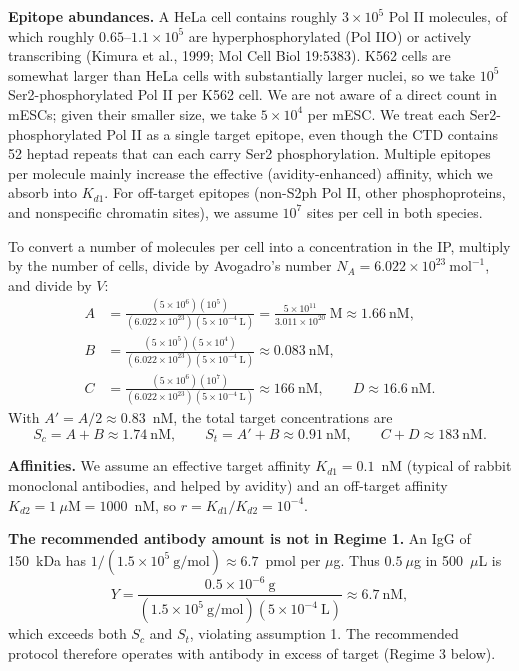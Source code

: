 \documentclass[11pt]{article}
\begin{document}
\textbf{Epitope abundances.} A HeLa cell contains roughly
$3\times10^5$ Pol II molecules, of which roughly $0.65$--$1.1\times10^5$
are hyperphosphorylated (Pol IIO) or actively transcribing (Kimura et
al., 1999; Mol Cell Biol 19:5383). K562 cells are somewhat larger than
HeLa cells with substantially larger nuclei, so we take
$10^5$ Ser2-phosphorylated Pol II per K562 cell. We are not aware of a
direct count in mESCs; given their smaller size, we take
$5\times10^4$ per mESC. We treat each Ser2-phosphorylated Pol II as a
single target epitope, even though the CTD contains 52 heptad repeats
that can each carry Ser2 phosphorylation. Multiple epitopes per
molecule mainly increase the effective (avidity-enhanced) affinity, which
we absorb into $K_{d1}$. For off-target epitopes (non-S2ph Pol II, other
phosphoproteins, and nonspecific chromatin sites), we assume $10^7$ sites
per cell in both species.

To convert a number of molecules per cell into a concentration in the IP,
multiply by the number of cells, divide by Avogadro's number
$N_A=6.022\times10^{23}~\text{mol}^{-1}$, and divide by $V$:
$$\begin{aligned}
A
&=\frac{(5\times10^6)(10^5)}{(6.022\times10^{23})(5\times10^{-4}~\text{L})}
=\frac{5\times10^{11}}{3.011\times10^{20}}~\text{M}
\approx1.66~\text{nM}, \\
B
&=\frac{(5\times10^5)(5\times10^4)}{(6.022\times10^{23})(5\times10^{-4}~\text{L})}
\approx0.083~\text{nM}, \\
C
&=\frac{(5\times10^6)(10^7)}{(6.022\times10^{23})(5\times10^{-4}~\text{L})}
\approx166~\text{nM},
\qquad
D\approx16.6~\text{nM}.
\end{aligned}$$
With $A'=A/2\approx0.83$~nM, the total target concentrations are
$$
S_c=A+B\approx1.74~\text{nM},
\qquad
S_t=A'+B\approx0.91~\text{nM},
\qquad
C+D\approx183~\text{nM}.
$$

\textbf{Affinities.} We assume an effective target affinity
$K_{d1}=0.1$~nM (typical of rabbit monoclonal antibodies, and helped by
avidity) and an off-target affinity $K_{d2}=1~\mu\text{M}=1000$~nM, so
$r=K_{d1}/K_{d2}=10^{-4}$.

\textbf{The recommended antibody amount is not in Regime 1.} An IgG of
150~kDa has $1/(1.5\times10^5~\text{g/mol})\approx6.7$~pmol per $\mu$g.
Thus $0.5~\mu$g in 500~$\mu$L is
$$
Y
=\frac{0.5\times10^{-6}~\text{g}}{(1.5\times10^5~\text{g/mol})(5\times10^{-4}~\text{L})}
\approx6.7~\text{nM},
$$
which exceeds both $S_c$ and $S_t$, violating assumption 1. The
recommended protocol therefore operates with antibody in excess of
target (Regime 3 below).
\end{document}
